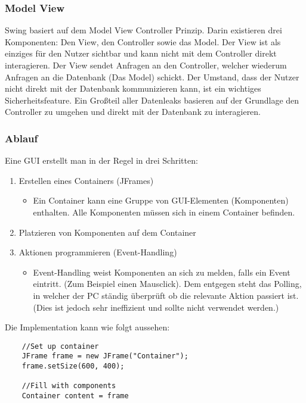 \documentclass{article}
\begin{document}
	\subsubsection{Model View}
	Swing basiert auf dem Model View Controller Prinzip. Darin existieren drei Komponenten: Den View, den Controller sowie das Model. Der View ist als einziges für den Nutzer sichtbar und kann nicht mit dem Controller direkt interagieren. Der View sendet Anfragen an den Controller, welcher wiederum Anfragen an die Datenbank (Das Model) schickt. Der Umstand, dass der Nutzer nicht direkt mit der Datenbank kommunizieren kann, ist ein wichtiges Sicherheitsfeature. Ein Großteil aller Datenleaks basieren auf der Grundlage den Controller zu umgehen und direkt mit der Datenbank zu interagieren.
	\subsubsection{Ablauf}
	Eine GUI erstellt man in der Regel in drei Schritten:
	\begin{enumerate}
		\item{Erstellen eines Containers (JFrames)}
		\begin{itemize}
			\item{Ein Container kann eine Gruppe von GUI-Elementen (Komponenten) enthalten. Alle Komponenten müssen sich in einem Container befinden.}
		\end{itemize}
		\item{Platzieren von Komponenten auf dem Container}
		\item{Aktionen programmieren (Event-Handling)}
		\begin{itemize}
			\item{Event-Handling weist Komponenten an sich zu melden, falls ein Event eintritt. (Zum Beispiel einen Mausclick). Dem entgegen steht das Polling, in welcher der PC ständig überprüft ob die relevante Aktion passiert ist. (Dies ist jedoch sehr ineffizient und sollte nicht verwendet werden.)}
		\end{itemize}
	\end{enumerate}
	Die Implementation kann wie folgt aussehen:
	\begin{verbatim}
	//Set up container
	JFrame frame = new JFrame("Container");
	frame.setSize(600, 400);

	//Fill with components
	Container content = frame
	\end{verbatim}
\end{document}
